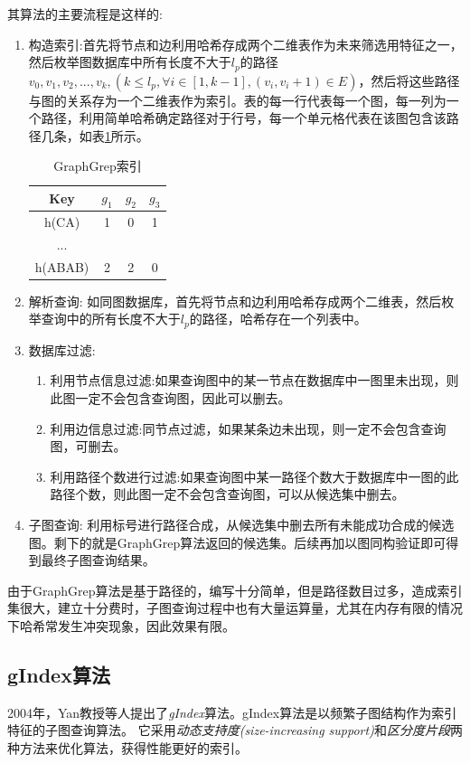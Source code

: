 \documentclass{XDBAthesis}
\begin{document}
其算法的主要流程是这样的:
\begin{enumerate}
    \item 构造索引:首先将节点和边利用哈希存成两个二维表作为未来筛选用特征之一，然后枚举图数据库中所有长度不大于$l_p $的路径$v_0 ,v_1 ,v_2 ,...,v_k ,( k\leq l_p ,\forall i\in [1,k-1],(v_i ,v_i+1)\in E) $，然后将这些路径与图的关系存为一个二维表作为索引。表的每一行代表每一个图，每一列为一个路径，利用简单哈希确定路径对于行号，每一个单元格代表在该图包含该路径几条，如表\ref{tb:grepIndex}所示。

\begin{table}[htb]
    \centering
    \begin{tabular}{|c|c|c|c|}
        \hline
        Key&$g_1 $&$g_2 $&$g_3 $ \\ \hline
        h(CA)&1&0&1 \\ \hline
        ...&&&\\ \hline
        h(ABAB)&2&2&0 \\
        \hline
    \end{tabular}
    \caption{GraphGrep索引}
    \label{tb:grepIndex}
\end{table}

    \item 解析查询: 如同图数据库，首先将节点和边利用哈希存成两个二维表，然后枚举查询中的所有长度不大于$l_p $的路径，哈希存在一个列表中。
    \item 数据库过滤: 
        \begin{enumerate}
            \item 利用节点信息过滤:如果查询图中的某一节点在数据库中一图里未出现，则此图一定不会包含查询图，因此可以删去。
            \item 利用边信息过滤:同节点过滤，如果某条边未出现，则一定不会包含查询图，可删去。
            \item 利用路径个数进行过滤:如果查询图中某一路径个数大于数据库中一图的此路径个数，则此图一定不会包含查询图，可以从候选集中删去。
        \end{enumerate}
    \item 子图查询: 利用标号进行路径合成，从候选集中删去所有未能成功合成的候选图。剩下的就是GraphGrep算法返回的候选集。后续再加以图同构验证即可得到最终子图查询结果。
\end{enumerate}
由于GraphGrep算法是基于路径的，编写十分简单，但是路径数目过多，造成索引集很大，建立十分费时，子图查询过程中也有大量运算量，尤其在内存有限的情况下哈希常发生冲突现象，因此效果有限。


\subsection{gIndex算法}
2004年，Yan教授等人提出了\emph{gIndex}算法\cite{gIndex}。gIndex算法是以频繁子图结构作为索引特征的子图查询算法。 它采用\emph{动态支持度(size-increasing support)}和\emph{区分度片段}两种方法来优化算法，获得性能更好的索引。
\end{document}
